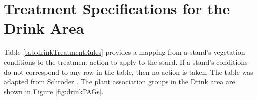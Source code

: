 
\chapter{Treatment Specifications for the Drink Area}
\label{chap:appendix_drinkTreatments}

Table \ref{tab:drinkTreatmentRules} provides a mapping from a stand's vegetation conditions to the treatment action to apply to the stand. If a stand's conditions do not correspond to any row in the table, then no action is taken. The table was adapted from Schroder \cite{schroder2016multi}. The plant association groups in the Drink area are shown in Figure \ref{fig:drinkPAGs}.

